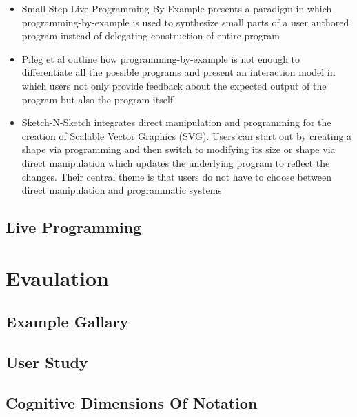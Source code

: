 \documentclass[sigconf,10pt]{acmart}
\begin{document}
\begin{itemize}
\item
  Small-Step Live Programming By Example presents a paradigm in which
  programming-by-example is used to synthesize small parts of a user
  authored program instead of delegating construction of entire program
\item
  Pileg et al outline how programming-by-example is not enough to
  differentiate all the possible programs and present an interaction
  model in which users not only provide feedback about the expected
  output of the program but also the program itself
\item
  Sketch-N-Sketch integrates direct manipulation and programming for the
  creation of Scalable Vector Graphics (SVG). Users can start out by
  creating a shape via programming and then switch to modifying its size
  or shape via direct manipulation which updates the underlying program
  to reflect the changes. Their central theme is that users do not have
  to choose between direct manipulation and programmatic systems
\end{itemize}

\hypertarget{live-programming-2}{%
\subsection{Live Programming}\label{live-programming-2}}

\hypertarget{sec:evaluation}{%
\section{Evaulation}\label{sec:evaluation}}

\hypertarget{example-gallary}{%
\subsection{Example Gallary}\label{example-gallary}}

\hypertarget{user-study}{%
\subsection{User Study}\label{user-study}}

\hypertarget{cognitive-dimensions-of-notation}{%
\subsection{Cognitive Dimensions Of
Notation}\label{cognitive-dimensions-of-notation}}
\end{document}

